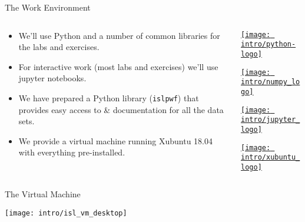 \documentclass[mathserif, aspectratio=169]{beamer}
\begin{document}
\begin{frame}{The Work Environment}
	\begin{columns}
		\begin{column}{0.6\textwidth}
			\begin{itemize}
				\item We'll use Python and a number of common libraries
					for the labs and exercises.
				\item For interactive work (most labs and exercises) we'll use
					jupyter notebooks.
				\item We have prepared a Python library ({\tt islpwf}) that provides
					easy access to \& documentation for all the data sets.
				\item We provide a virtual machine running Xubuntu 18.04 with everything
					pre-installed.
			\end{itemize}
		\end{column}
		\begin{column}{0.4\textwidth}
			\begin{center}
				\href{https://www.python.org/}{\texttt{[image: intro/python-logo]}}
			\end{center}
			\begin{center}
				\href{https://numpy.org/}{\texttt{[image: intro/numpy\_logo]}}
			\end{center}
			\begin{center}
				\href{https://jupyter.org/}{\texttt{[image: intro/jupyter\_logo]}}
			\end{center}
			\begin{center}
				\href{https://xubuntu.org/}{\texttt{[image: intro/xubuntu\_logo]}}
			\end{center}
		\end{column}
	\end{columns}
\end{frame}

\begin{frame}{The Virtual Machine}
	\begin{center}
		\texttt{[image: intro/isl\_vm\_desktop]}
	\end{center}
\end{frame}
\end{document}

